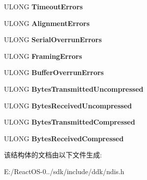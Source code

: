 \begin{DoxyCompactItemize}
U\+L\+O\+NG {\bfseries Timeout\+Errors}
\item 
\mbox{\label{struct___n_d_i_s___w_a_n___g_e_t___s_t_a_t_s_a977bad34ec67bc6f4885567f3f039fff}} 
U\+L\+O\+NG {\bfseries Alignment\+Errors}
\item 
\mbox{\label{struct___n_d_i_s___w_a_n___g_e_t___s_t_a_t_s_a49c9108851834d8d97058976a16d4335}} 
U\+L\+O\+NG {\bfseries Serial\+Overrun\+Errors}
\item 
\mbox{\label{struct___n_d_i_s___w_a_n___g_e_t___s_t_a_t_s_a1c1f91faec94d18bb04de625ddfaf7ef}} 
U\+L\+O\+NG {\bfseries Framing\+Errors}
\item 
\mbox{\label{struct___n_d_i_s___w_a_n___g_e_t___s_t_a_t_s_a74d3dffb4f37fcebb8ad37bc58388d0f}} 
U\+L\+O\+NG {\bfseries Buffer\+Overrun\+Errors}
\item 
\mbox{\label{struct___n_d_i_s___w_a_n___g_e_t___s_t_a_t_s_a93ae67a4a0fc8e167b5aaba1b8d48f5c}} 
U\+L\+O\+NG {\bfseries Bytes\+Transmitted\+Uncompressed}
\item 
\mbox{\label{struct___n_d_i_s___w_a_n___g_e_t___s_t_a_t_s_a52dfe992f9dd1d196a52645b6a3fcd59}} 
U\+L\+O\+NG {\bfseries Bytes\+Received\+Uncompressed}
\item 
\mbox{\label{struct___n_d_i_s___w_a_n___g_e_t___s_t_a_t_s_adab8e48fcb5f462d1585b71622064a8a}} 
U\+L\+O\+NG {\bfseries Bytes\+Transmitted\+Compressed}
\item 
\mbox{\label{struct___n_d_i_s___w_a_n___g_e_t___s_t_a_t_s_a054d186138db65e439140207aa004055}} 
U\+L\+O\+NG {\bfseries Bytes\+Received\+Compressed}
\end{DoxyCompactItemize}


该结构体的文档由以下文件生成\+:\begin{DoxyCompactItemize}
\item 
E\+:/\+React\+O\+S-\/0../sdk/include/ddk/ndis.\+h\end{DoxyCompactItemize}
